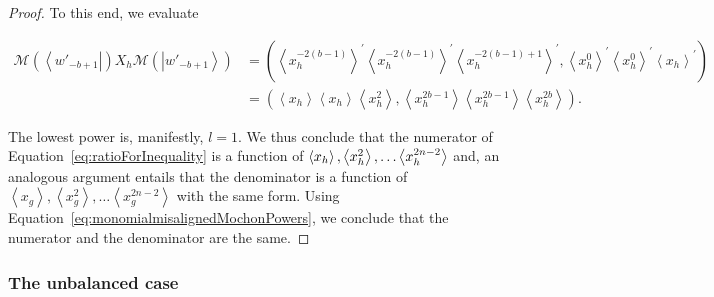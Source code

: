 \documentclass{theoretics}
\begin{document}
\begin{proof}
  To this end, we evaluate
  \begin{small}
    \begin{align*}
      \mathcal{M}(\left\langle w'_{-b+1}\right|)X_{h}\mathcal{M}(\left|w'_{-b+1}\right\rangle ) & =\left(\left\langle x_{h}^{-2(b-1)}\right\rangle ^{\prime}\left\langle x_{h}^{-2(b-1)}\right\rangle ^{\prime}\left\langle x_{h}^{-2(b-1)+1}\right\rangle ^{\prime},\left\langle x_{h}^{0}\right\rangle ^{\prime}\left\langle x_{h}^{0}\right\rangle ^{\prime}\left\langle x_{h}\right\rangle ^{\prime}\right) \\
                                                                                                & =\left(\left\langle x_{h}\right\rangle \left\langle x_{h}\right\rangle \left\langle x_{h}^{2}\right\rangle ,\left\langle x_{h}^{2b-1}\right\rangle \left\langle x_{h}^{2b-1}\right\rangle \left\langle x_{h}^{2b}\right\rangle \right).
    \end{align*}
  \end{small}
  The lowest power is, manifestly, $l=1$. We thus conclude that the
  numerator of Equation~\eqref{eq:ratioForInequality} is a function of $\left\langle x_{h}\right\rangle ,\left\langle x_{h}^{2}\right\rangle ,\dots\text{\ensuremath{\left\langle x_{h}^{2n-2}\right\rangle }}$ and,
  an analogous argument entails that the denominator is a function of
  $\left\langle x_{g}\right\rangle ,\left\langle x_{g}^{2}\right\rangle ,\dots\left\langle x_{g}^{2n-2}\right\rangle $
  with the same form. Using Equation~\eqref{eq:monomialmisalignedMochonPowers},
  we conclude that the numerator and the denominator are the same.
\end{proof}



\subsubsection{The unbalanced case}
\label{subsubsec:unbalancedmonomialalgebraic}
\end{document}
